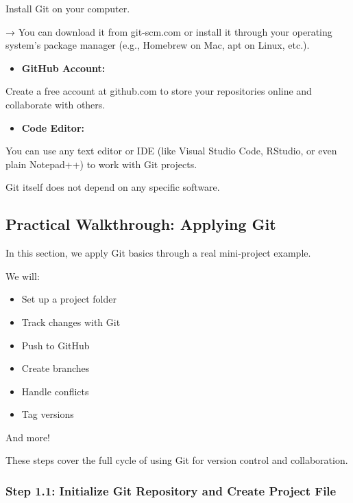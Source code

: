 \documentclass[
  11pt,
  a4paper,
]{article}
\providecommand{\tightlist}{%
  \setlength{\itemsep}{0pt}\setlength{\parskip}{0pt}}\usepackage{longtable,booktabs,array}
\begin{document}
Install Git on your computer.

→ You can download it from git-scm.com or install it through your
operating system's package manager (e.g., Homebrew on Mac, apt on Linux,
etc.).

\begin{itemize}
\tightlist
\item
  \textbf{GitHub Account:}
\end{itemize}

Create a free account at github.com to store your repositories online
and collaborate with others.

\begin{itemize}
\tightlist
\item
  \textbf{Code Editor:}
\end{itemize}

You can use any text editor or IDE (like Visual Studio Code, RStudio, or
even plain Notepad++) to work with Git projects.

Git itself does not depend on any specific software. \newpage

\subsection{Practical Walkthrough: Applying
Git}\label{practical-walkthrough-applying-git}

In this section, we apply Git basics through a real mini-project
example.

We will:

\begin{itemize}
\item
  Set up a project folder
\item
  Track changes with Git
\item
  Push to GitHub
\item
  Create branches
\item
  Handle conflicts
\item
  Tag versions
\end{itemize}

And more!

These steps cover the full cycle of using Git for version control and
collaboration.

\subsubsection{Step 1.1: Initialize Git Repository and Create Project
File}\label{step-1.1-initialize-git-repository-and-create-project-file}
\end{document}
